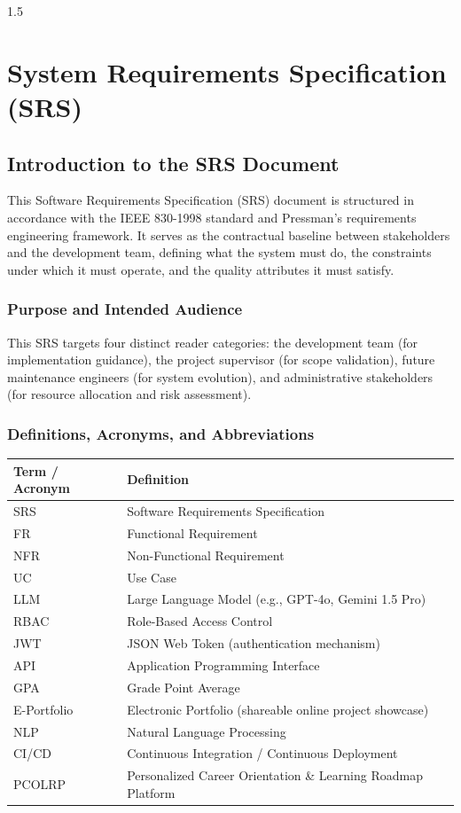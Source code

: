 \documentclass[12pt,a4paper]{report}
\begin{document}
\begin{spacing}{1.5}
		\chapter{System Requirements Specification (SRS)}
		
		\section{Introduction to the SRS Document}
		
		This Software Requirements Specification (SRS) document is structured in accordance with the IEEE 830-1998 standard and Pressman's requirements engineering framework. It serves as the contractual baseline between stakeholders and the development team, defining what the system must do, the constraints under which it must operate, and the quality attributes it must satisfy.
		
		\subsection{Purpose and Intended Audience}
		
		This SRS targets four distinct reader categories: the development team (for implementation guidance), the project supervisor (for scope validation), future maintenance engineers (for system evolution), and administrative stakeholders (for resource allocation and risk assessment).
		
		\subsection{Definitions, Acronyms, and Abbreviations}
		
		\begin{longtable}{|p{3.5cm}|p{11cm}|}
			\hline
			\rowcolor{gray!20}\textbf{Term / Acronym} & \textbf{Definition} \\ \hline
			SRS & Software Requirements Specification \\ \hline
			FR & Functional Requirement \\ \hline
			NFR & Non-Functional Requirement \\ \hline
			UC & Use Case \\ \hline
			LLM & Large Language Model (e.g., GPT-4o, Gemini 1.5 Pro) \\ \hline
			RBAC & Role-Based Access Control \\ \hline
			JWT & JSON Web Token (authentication mechanism) \\ \hline
			API & Application Programming Interface \\ \hline
			GPA & Grade Point Average \\ \hline
			E-Portfolio & Electronic Portfolio (shareable online project showcase) \\ \hline
			NLP & Natural Language Processing \\ \hline
			CI/CD & Continuous Integration / Continuous Deployment \\ \hline
			PCOLRP & Personalized Career Orientation \& Learning Roadmap Platform \\ \hline
		\end{longtable}
		

\end{spacing}
\end{document}
